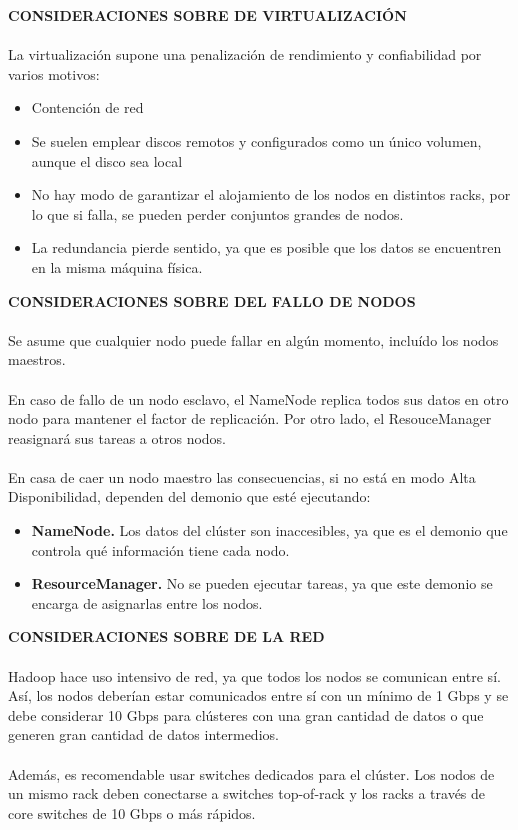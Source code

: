 \textbf{CONSIDERACIONES SOBRE DE VIRTUALIZACIÓN}\\\\
La virtualización supone una penalización de rendimiento y confiabilidad por varios motivos:
\begin{itemize}
	\item Contención de red
	\item Se suelen emplear discos remotos y configurados como un único volumen, aunque
	el disco sea local
	\item No hay modo de garantizar el alojamiento de los nodos en distintos racks, por lo que si falla, se pueden perder conjuntos grandes de nodos.
	\item La redundancia pierde sentido, ya que es posible que los datos se encuentren en la misma máquina física.
\end{itemize}
\textbf{CONSIDERACIONES SOBRE DEL FALLO DE NODOS}\\\\
Se asume que cualquier nodo puede fallar en algún momento, incluído los nodos maestros.\\\\
En caso de fallo de un nodo esclavo, el NameNode replica todos sus datos en otro nodo para mantener el factor de replicación. Por otro lado, el ResouceManager reasignará sus tareas a otros nodos.\\\\
En casa de caer un nodo maestro las consecuencias, si no está en modo Alta Disponibilidad, dependen del demonio que esté ejecutando:
\begin{itemize}
	\item \textbf{NameNode.} Los datos del clúster son inaccesibles, ya que es el demonio que controla qué información tiene cada nodo.
	\item \textbf{ResourceManager.} No se pueden ejecutar tareas, ya que este demonio se encarga de asignarlas entre los nodos.
\end{itemize}
\textbf{CONSIDERACIONES SOBRE DE LA RED}\\\\
Hadoop hace uso intensivo de red, ya que todos los nodos se comunican entre sí. Así, los nodos deberían estar comunicados entre sí con un mínimo de 1 Gbps y se debe considerar 10 Gbps para clústeres con una gran cantidad de datos o que generen gran cantidad de datos intermedios.\\\\
Además, es recomendable usar switches dedicados para el clúster. Los nodos de un mismo rack deben conectarse a switches top-of-rack y los racks a través de core switches de 10 Gbps o más rápidos. \\\\
